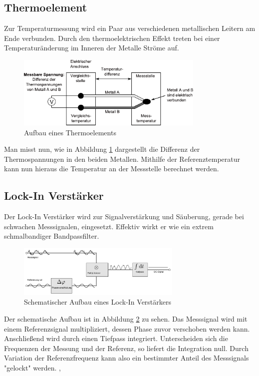 		\subsection{Thermoelement}
Zur Temperaturmessung wird ein Paar aus verschiedenen metallischen Leitern am Ende
verbunden. Durch den thermoelektrischen Effekt treten bei einer Temperaturänderung
im Inneren der Metalle Ströme auf.
\begin{figure}[h]
	\centering
	\includegraphics[width=0.8\textwidth]{Abb/thermo.pdf}
	\caption{Aufbau eines Thermoelements \cite{thermowiki}}
	\label{Abb:thermo}
\end{figure}
Man misst nun, wie in Abbildung \ref{Abb:thermo} dargestellt die Differenz der 
Thermospannungen in den beiden Metallen. Mithilfe der Referenztemperatur kann nun
hieraus die Temperatur an der Messstelle berechnet werden. \cite{thermowiki}

		\subsection{Lock-In Verstärker}
Der Lock-In Verstärker wird zur Signalverstärkung und Säuberung, gerade bei 
schwachen Messsignalen, eingesetzt. Effektiv wirkt er wie ein extrem schmalbandiger
Bandpassfilter.
\begin{figure}[h]
	\centering
	\includegraphics[width=0.7\textwidth]{Abb/lockin.pdf}
	\caption{Schematischer Aufbau eines Lock-In Verstärkers \cite{lockinwiki}}
	\label{Abb:lockin}
\end{figure}
Der schematische Aufbau ist in Abbildung \ref{Abb:lockin} zu sehen. Das Messsignal
wird mit einem Referenzsignal multipliziert, dessen Phase zuvor verschoben werden 
kann. Anschließend wird durch einen Tiefpass integriert. Unterscheiden sich die 
Frequenzen der Messung und der Referenz, so liefert die Integration null. Durch
Variation der Referenzfrequenz kann also ein bestimmter Anteil des Messsignals
"gelockt" werden. \cite{lockinwiki}, \cite{kreuzwiki}
